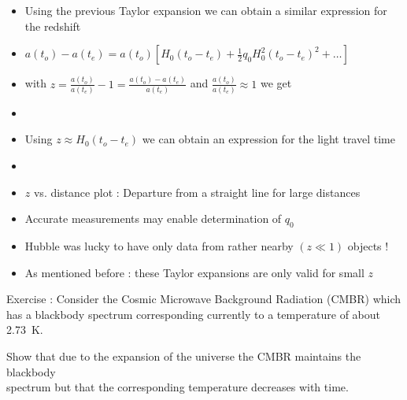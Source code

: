 \Tr
\begin{itemize}
\item Using the previous Taylor expansion we can obtain a similar expression for the redshift
\item[] $a(t_{o})-a(t_{e})=a(t_{o})\left[H_{0}(t_{o}-t_{e})+\frac{1}{2}q_{0}H_{0}^{2}(t_{o}-t_{e})^{2}+\ldots\right]$
\item[] with $\displaystyle z=\frac{a(t_{o})}{a(t_{e})}-1=\frac{a(t_{o})-a(t_{e})}{a(t_{e})}$
        and $\displaystyle \frac{a(t_{o})}{a(t_{e})} \approx 1$ we get
\item[] \begin{center}
        {\red {}}
        \end{center}
\item Using $z \approx H_{0}(t_{o}-t_{e})$ we can obtain an expression for the {\blue light travel time}
\item[] \begin{center}
        {\red {}}
        \end{center}
\item[$\ast$] $z$ vs. distance plot : Departure from a straight line for large distances
\item[] Accurate measurements may enable determination of $q_{0}$
\item[] Hubble was lucky to have only data from rather nearby $(z \ll 1)$ objects ! 
\item As mentioned before : these Taylor expansions are only valid for small $z$
\end{itemize}

\Tr
\onecolumn
\begin{itemize}
{\red
\item[$\ast$] Exercise : Consider the Cosmic Microwave Background Radiation (CMBR) which has a
              blackbody spectrum corresponding currently to a temperature of about 2.73~K.
\item Show that due to the expansion of the universe the CMBR maintains the blackbody\\
      spectrum but that the corresponding temperature decreases with time.
}
\end{itemize}